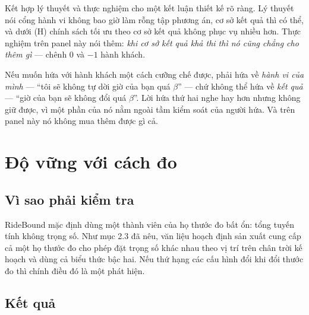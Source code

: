 Kết hợp lý thuyết và thực nghiệm cho một kết luận thiết kế rõ ràng. Lý thuyết nói cổng hành vi
không bao giờ làm rỗng tập phương án, cơ sở kết quả thì có thể, và dưới (H) chính sách tối ưu
theo cơ sở kết quả không phục vụ nhiều hơn. Thực nghiệm trên panel này nói thêm: \emph{khi cơ sở
kết quả khả thi thì nó cũng chẳng cho thêm gì} --- chênh 0 và $-1$ hành khách.

\begin{khungy}
Nếu muốn hứa với hành khách một cách cưỡng chế được, phải hứa về \emph{hành vi của mình} ---
``tôi sẽ không tự dời giờ của bạn quá $\beta$'' --- chứ không thể hứa về \emph{kết quả} ---
``giờ của bạn sẽ không đổi quá $\beta$''. Lời hứa thứ hai nghe hay hơn nhưng không giữ được, vì
một phần của nó nằm ngoài tầm kiểm soát của người hứa. Và trên panel này nó không mua thêm được
gì cả.
\end{khungy}

\section{Độ vững với cách đo}
\label{muc:dovung}

\subsection{Vì sao phải kiểm tra}

RideBound mặc định dùng một thành viên của họ thước đo bất ổn: tổng tuyến tính không trọng số.
Như mục 2.3 đã nêu, văn liệu hoạch định sản xuất cung cấp cả một họ thước đo cho phép đặt trọng
số khác nhau theo vị trí trên chân trời kế hoạch và dùng cả biểu thức bậc hai. Nếu thứ hạng các
cấu hình đổi khi đổi thước đo thì chính điều đó là một phát hiện.

\subsection{Kết quả}

